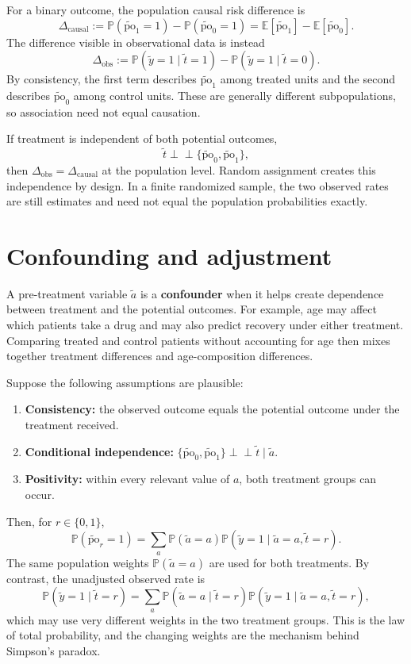 \documentclass[11pt]{article}
\newcommand{\Pbb}{\mathbb{P}}
\newcommand{\E}{\mathbb{E}}
\newcommand{\rv}[1]{\widetilde{#1}}
\newcommand{\po}[1]{\widetilde{\mathrm{po}}_{#1}}
\newcommand{\indep}{\mathrel{\perp\!\!\!\perp}}
\begin{document}
For a binary outcome, the population causal risk difference is
\[
  \Delta_{\mathrm{causal}}
  :=\Pbb(\po{1}=1)-\Pbb(\po{0}=1)
  =\E[\po{1}]-\E[\po{0}].
\]
The difference visible in observational data is instead
\[
  \Delta_{\mathrm{obs}}
  :=\Pbb(\rv{y}=1\mid\rv{t}=1)
    -\Pbb(\rv{y}=1\mid\rv{t}=0).
\]
By consistency, the first term describes $\po{1}$ among treated units and the
second describes $\po{0}$ among control units. These are generally different
subpopulations, so association need not equal causation.

If treatment is independent of both potential outcomes,
\[
  \rv{t}\indep\{\po{0},\po{1}\},
\]
then $\Delta_{\mathrm{obs}}=\Delta_{\mathrm{causal}}$ at the population level.
Random assignment creates this independence by design. In a finite randomized
sample, the two observed rates are still estimates and need not equal the
population probabilities exactly.

\section{Confounding and adjustment}

A pre-treatment variable $\rv{a}$ is a \textbf{confounder} when it helps create
dependence between treatment and the potential outcomes. For example, age may
affect which patients take a drug and may also predict recovery under either
treatment. Comparing treated and control patients without accounting for age
then mixes together treatment differences and age-composition differences.

Suppose the following assumptions are plausible:
\begin{enumerate}[label=\arabic*.,leftmargin=2em,itemsep=0.2em]
  \item \textbf{Consistency:} the observed outcome equals the potential outcome
        under the treatment received.
  \item \textbf{Conditional independence:}
        $\{\po{0},\po{1}\}\indep\rv{t}\mid\rv{a}$.
  \item \textbf{Positivity:} within every relevant value of $a$, both treatment
        groups can occur.
\end{enumerate}
Then, for $r\in\{0,1\}$,
\[
  \boxed{
  \Pbb(\po{r}=1)
  =\sum_a \Pbb(\rv{a}=a)
     \Pbb(\rv{y}=1\mid\rv{a}=a,\rv{t}=r).}
\]
The same population weights $\Pbb(\rv{a}=a)$ are used for both treatments.
By contrast, the unadjusted observed rate is
\[
  \Pbb(\rv{y}=1\mid\rv{t}=r)
  =\sum_a \Pbb(\rv{a}=a\mid\rv{t}=r)
     \Pbb(\rv{y}=1\mid\rv{a}=a,\rv{t}=r),
\]
which may use very different weights in the two treatment groups. This is the
law of total probability, and the changing weights are the mechanism behind
Simpson's paradox.
\end{document}
